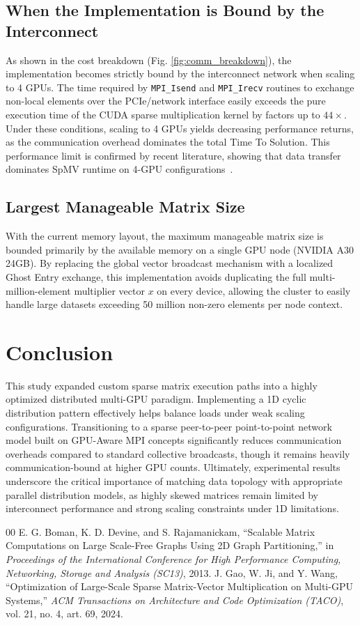 \documentclass[conference]{IEEEtran}
\begin{document}
\subsection{When the Implementation is Bound by the Interconnect}
As shown in the cost breakdown (Fig. \ref{fig:comm_breakdown}), the implementation becomes strictly bound by the interconnect network when scaling to 4 GPUs. The time required by \texttt{MPI\_Isend} and \texttt{MPI\_Irecv} routines to exchange non-local elements over the PCIe/network interface easily exceeds the pure execution time of the CUDA sparse multiplication kernel by factors up to $44\times$. Under these conditions, scaling to 4 GPUs yields decreasing performance returns, as the communication overhead dominates the total Time To Solution. This performance limit is confirmed by recent literature, showing that data transfer dominates SpMV runtime on 4-GPU configurations~\cite{gao2024optimization}.

\subsection{Largest Manageable Matrix Size}
With the current memory layout, the maximum manageable matrix size is bounded primarily by the available memory on a single GPU node (NVIDIA A30 24GB). By replacing the global vector broadcast mechanism with a localized Ghost Entry exchange, this implementation avoids duplicating the full multi-million-element multiplier vector $x$ on every device, allowing the cluster to easily handle large datasets exceeding 50 million non-zero elements per node context.

\section{Conclusion}
This study expanded custom sparse matrix execution paths into a highly optimized distributed multi-GPU paradigm. Implementing a 1D cyclic distribution pattern effectively helps balance loads under weak scaling configurations. Transitioning to a sparse peer-to-peer point-to-point network model built on GPU-Aware MPI concepts significantly reduces communication overheads compared to standard collective broadcasts, though it remains heavily communication-bound at higher GPU counts. Ultimately, experimental results underscore the critical importance of matching data topology with appropriate parallel distribution models, as highly skewed matrices remain limited by interconnect performance and strong scaling constraints under 1D limitations.

\begin{thebibliography}{00}
 E. G. Boman, K. D. Devine, and S. Rajamanickam, ``Scalable Matrix Computations on Large Scale-Free Graphs Using 2D Graph Partitioning,'' in \textit{Proceedings of the International Conference for High Performance Computing, Networking, Storage and Analysis (SC13)}, 2013.
 J. Gao, W. Ji, and Y. Wang, ``Optimization of Large-Scale Sparse Matrix-Vector Multiplication on Multi-GPU Systems,'' \textit{ACM Transactions on Architecture and Code Optimization (TACO)}, vol. 21, no. 4, art. 69, 2024.
\end{thebibliography}
\end{document}
